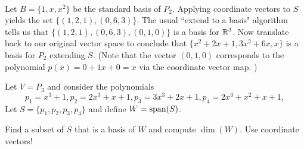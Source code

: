 \\
\begin{solution}
\noindent Let $B=\{1,x,x^2\}$ be the standard basis of $P_2$. Applying coordinate vectors to $S$ yields the set $\{ (1,2,1), (0,6,3)\}$. The usual ``extend to a basis" algorithm tells us that $\{(1,2,1), (0,6,3), (0,1,0)\}$ is a basis for ${\mathbb R}^3$. Now translate back to our original vector space to conclude that $\{ x^2+2x+1, 3x^2+6x, x\}$ is a basis for $P_2$ extending $S$. (Note that the vector $(0,1,0)$ corresponds to the polynomial $p(x)=0+1x+0=x$ via the coordinate vector map. )
\end{solution}
\ii Let $V=P_3$ and consider the polynomials 
\[
p_1=x^3+1, p_2=2x^3+x+1, p_3=3x^3+2x+1, p_4=2x^3+x^2+x+1,
\]
Let $S=\{p_1, p_2, p_3, p_4\}$ and define $W=\operatorname{span}(S)$. 

Find a subset of $S$ that is a basis of $W$ and compute $\dim(W)$. Use coordinate vectors!
